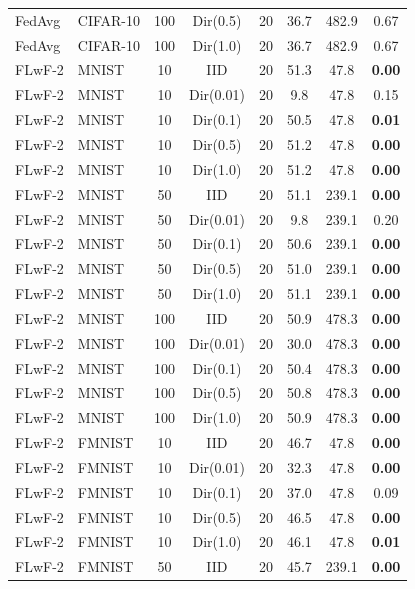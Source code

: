 \begin{table}[t]
\begin{tabular}{llcccccc}
FedAvg & CIFAR-10 & 100 & Dir(0.5)  & 20 &  36.7 &  482.9 & 0.67 \\
FedAvg & CIFAR-10 & 100 & Dir(1.0)  & 20 &  36.7 &  482.9 & 0.67 \\
\midrule
FLwF-2 & MNIST    &  10 & IID       & 20 &  51.3 &   47.8 & \textbf{0.00} \\
FLwF-2 & MNIST    &  10 & Dir(0.01) & 20 &   9.8 &   47.8 & 0.15 \\
FLwF-2 & MNIST    &  10 & Dir(0.1)  & 20 &  50.5 &   47.8 & \textbf{0.01} \\
FLwF-2 & MNIST    &  10 & Dir(0.5)  & 20 &  51.2 &   47.8 & \textbf{0.00} \\
FLwF-2 & MNIST    &  10 & Dir(1.0)  & 20 &  51.2 &   47.8 & \textbf{0.00} \\
FLwF-2 & MNIST    &  50 & IID       & 20 &  51.1 &  239.1 & \textbf{0.00} \\
FLwF-2 & MNIST    &  50 & Dir(0.01) & 20 &   9.8 &  239.1 & 0.20 \\
FLwF-2 & MNIST    &  50 & Dir(0.1)  & 20 &  50.6 &  239.1 & \textbf{0.00} \\
FLwF-2 & MNIST    &  50 & Dir(0.5)  & 20 &  51.0 &  239.1 & \textbf{0.00} \\
FLwF-2 & MNIST    &  50 & Dir(1.0)  & 20 &  51.1 &  239.1 & \textbf{0.00} \\
FLwF-2 & MNIST    & 100 & IID       & 20 &  50.9 &  478.3 & \textbf{0.00} \\
FLwF-2 & MNIST    & 100 & Dir(0.01) & 20 &  30.0 &  478.3 & \textbf{0.00} \\
FLwF-2 & MNIST    & 100 & Dir(0.1)  & 20 &  50.4 &  478.3 & \textbf{0.00} \\
FLwF-2 & MNIST    & 100 & Dir(0.5)  & 20 &  50.8 &  478.3 & \textbf{0.00} \\
FLwF-2 & MNIST    & 100 & Dir(1.0)  & 20 &  50.9 &  478.3 & \textbf{0.00} \\
\midrule
FLwF-2 & FMNIST   &  10 & IID       & 20 &  46.7 &   47.8 & \textbf{0.00} \\
FLwF-2 & FMNIST   &  10 & Dir(0.01) & 20 &  32.3 &   47.8 & \textbf{0.00} \\
FLwF-2 & FMNIST   &  10 & Dir(0.1)  & 20 &  37.0 &   47.8 & 0.09 \\
FLwF-2 & FMNIST   &  10 & Dir(0.5)  & 20 &  46.5 &   47.8 & \textbf{0.00} \\
FLwF-2 & FMNIST   &  10 & Dir(1.0)  & 20 &  46.1 &   47.8 & \textbf{0.01} \\
FLwF-2 & FMNIST   &  50 & IID       & 20 &  45.7 &  239.1 & \textbf{0.00} \\

\end{tabular}
\end{table}
